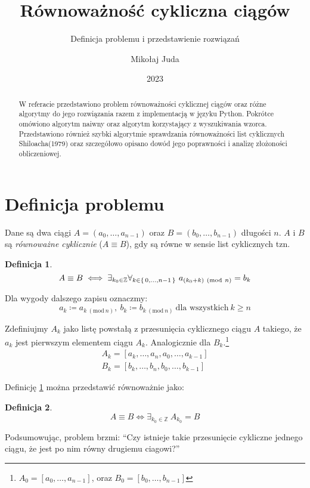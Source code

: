 \documentclass{scrartcl}
\title{Równoważność cykliczna ciągów}
\subtitle{Definicja problemu i przedstawienie rozwiązań}
\date{2023}
\author{Mikołaj Juda}
\newcommand{\Mod}[1]{\ (\mathrm{mod}\ #1)}
\theoremstyle{definition}
\newtheorem{cyclic_equivalence_1}{Definicja}[section]
\theoremstyle{definition}
\newtheorem{cyclic_equivalence_2}
[cyclic_equivalence_1]{Definicja}
\begin{document}
\maketitle
\begin{abstract}
    W referacie przedstawiono
    problem równoważności cyklicznej ciągów
    oraz różne algorytmy do jego rozwiązania
    razem z implementacją w języku Python.
    Pokrótce omówiono algorytm naiwny
    oraz algorytm korzystający z wyszukiwania wzorca.
    Przedstawiono również
    szybki algorytmie sprawdzania równoważności
    list cyklicznych Shiloacha(1979)\cite{shiloach1979}
    oraz szczegółowo opisano dowód jego poprawności
    i analizę złożoności obliczeniowej.
\end{abstract}
\tableofcontents
\pagebreak
\section{Definicja problemu}
Dane są dwa ciągi
\(A=(a_0,\ldots,a_{n-1})\) oraz \(B=(b_0,\ldots,b_{n-1})\)
długości \(n\).\linebreak
\(A\) i \(B\) są \emph{równoważne cyklicznie}
(\(A\equiv B\)),
gdy są równe w sensie list cyklicznych tzn.
\begin{cyclic_equivalence_1}
    \label{def:cyclic_equivalence_1}
    \[A\equiv B \iff \exists_{k_0\in\mathbb{Z}}
        \forall_{k\in\set{0,\ldots,n-1}}\ a_{(k_0+k)\Mod{n}}=b_k\]
\end{cyclic_equivalence_1}

Dla wygody dalszego zapisu oznaczmy:
\[a_k\coloneq a_{k\Mod{n}},\ b_k\coloneq b_{k\Mod{n}}
    \ \text{dla wszystkich}\ k\ge n\]

Zdefiniujmy \(A_k\) jako listę powstałą z przesunięcia cyklicznego
ciągu \(A\) takiego, że \(a_k\) jest
pierwszym elementem ciągu \(A_k\).
Analogicznie dla \(B_k\).\footnote{\(A_0=[a_0,\ldots,a_{n-1}]\),
oraz \(B_0=[b_0,\ldots,b_{n-1}]\)}
\begin{align*}
    A_k=[a_{k},\ldots,a_n,a_0,\ldots,a_{k-1}] \\
    B_k=[b_{k},\ldots,b_n,b_0,\ldots,b_{k-1}]
\end{align*}

Definicję \cref{def:cyclic_equivalence_1} można
przedstawić równoważnie jako:
\begin{cyclic_equivalence_2}
    \[A\equiv B \iff \exists_{k_0\in\mathbb{Z}}
        \ A_{k_0}=B\]
\end{cyclic_equivalence_2}

Podsumowując, problem brzmi:
\enquote{Czy istnieje takie przesunięcie cykliczne jednego ciągu,
    że jest po nim równy drugiemu ciagowi?}
\pagebreak
\end{document}
